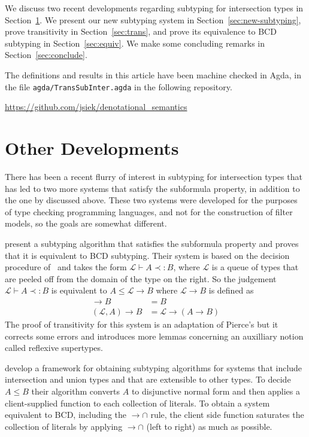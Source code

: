 \documentclass{article}
\begin{document}
We discuss two recent developments regarding subtyping for
intersection types in Section~\ref{sec:other-developments}.  We
present our new subtyping system in Section~\ref{sec:new-subtyping},
prove transitivity in Section~\ref{sec:trans}, and prove its
equivalence to BCD subtyping in Section~\ref{sec:equiv}. We make some
concluding remarks in Section~\ref{sec:conclude}.

The definitions and results in this article have been machine checked
in Agda, in the file \texttt{agda/TransSubInter.agda} in the following
repository.

\begin{center}
  \url{https://github.com/jsiek/denotational_semantics}
\end{center}

\section{Other Developments}
\label{sec:other-developments}

There has been a recent flurry of interest in subtyping for
intersection types that has led to two more systems that satisfy the
subformula property, in addition to the one by \citet{Laurent:2018aa}
discussed above. These two systems were developed for the purposes of
type checking programming languages, and not for the construction of
filter models, so the goals are somewhat different.

\citet{Bi:2018aa} present a subtyping algorithm that satisfies the
subformula property and proves that it is equivalent to BCD
subtyping. Their system is based on the decision procedure
of~\citet{Pierce:1989aa} and takes the form $\mathcal{L} \vdash A
\prec: B$, where $\mathcal{L}$ is a queue of types that are peeled off
from the domain of the type on the right. So the judgement
$\mathcal{L} \vdash A \prec: B$ is equivalent to $A \leq \mathcal{L}
\to B$ where $\mathcal{L} \to B$ is defined as
\begin{align*}
  [] \to B &= B\\
  (\mathcal{L},A) \to B &= \mathcal{L} \to (A \to B)
\end{align*}
The proof of transitivity for this system is an adaptation of Pierce's
but it corrects some errors and introduces more lemmas concerning an
auxilliary notion called reflexive supertypes.

\citet{Muehlboeck:2018aa} develop a framework for obtaining subtyping
algorithms for systems that include intersection and union types and
that are extensible to other types. To decide $A \leq B$ their
algorithm converts $A$ to disjunctive normal form and then applies a
client-supplied function to each collection of literals. To obtain a
system equivalent to BCD, including the ${\to}{\cap}$ rule, the client
side function saturates the collection of literals by applying
${\to}{\cap}$ (left to right) as much as possible.
\end{document}
